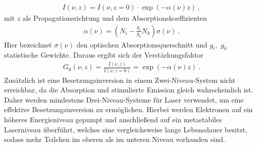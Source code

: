 \begin{align}
    I(\nu, z) = I(\nu, z=0)\cdot \exp(- \alpha(\nu)z)\,, \label{eqn:IntensitaetVerstaerkung}
\end{align}
mit $z$ als Propagationsrichtung und dem Absorptionskoeffizienten 
\begin{align}
    \alpha(\nu) = \left(N_i - \frac{g_i}{g_k} N_k \right)\sigma(\nu)\,. \label{eqn:Absorptionskoeffizienten}
\end{align}
Hier bezeichnet $\sigma(\nu)$ den optischen Absorptionsquerschnitt und $g_i,\,\,g_k$ statistische Gewichte.
Daraus ergibt sich der Verstärkungsfaktor 
\begin{align}
    G_0(\nu, z) = \frac{I(\nu, z)}{I(\nu, z=0)}= \exp(-\alpha(\nu) z)\,. \label{eqn:Verstaerkungsfaktor}
\end{align}
Zusätzlich ist eine Besetzungsinversion in einem Zwei-Niveau-System nicht erreichbar, da die Absorption und stimulierte Emission gleich wahrscheinlich ist. Daher werden mindestens Drei-Niveau-Systeme für Laser verwendet, um eine effektive Besetzungsinversion zu ermöglichen. Hierbei werden Elektronen auf ein höheres Energieniveau gepumpt und anschließend auf ein metastabiles Laserniveau überführt, welches eine vergleichsweise lange Lebensdauer besitzt, sodass mehr Teilchen im oberen als im unteren Niveau vorhanden sind. \cite{laserspektroskopie} \cite{laser}


